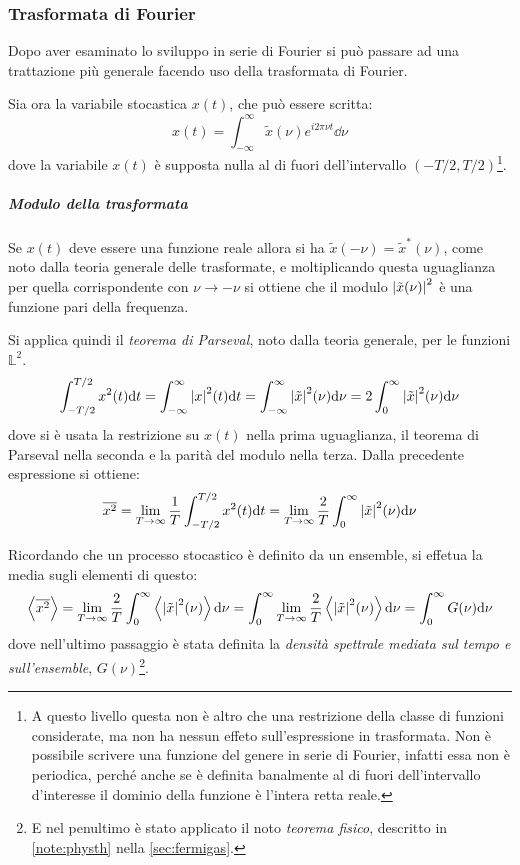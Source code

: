 \subsubsection{Trasformata di Fourier}

Dopo aver esaminato lo sviluppo in serie di Fourier si può passare ad una trattazione più generale facendo uso della trasformata di Fourier.

Sia ora la variabile stocastica $ x(t) $, che può essere scritta:
\[ x(t) = \int_{-\infty}^{\infty} \tilde{x}(\nu) e ^{i 2\pi \nu t} \dd \nu \]
dove la variabile $ x(t) $ è supposta nulla al di fuori dell'intervallo $ (-T/2, T/2) $\footnote{A questo livello questa non è altro che una restrizione della classe di funzioni considerate, ma non ha nessun effeto sull'espressione in trasformata. Non è possibile scrivere una funzione del genere in serie di Fourier, infatti essa non è periodica, perché anche se è definita banalmente al di fuori dell'intervallo d'interesse il dominio della funzione è l'intera retta reale.}.

\subparagraph{Modulo della trasformata}	Se $ x(t) $ deve essere una funzione reale allora si ha $ \tilde{x}(-\nu) = \tilde{x}^\ast(\nu) $, come noto dalla teoria generale delle trasformate, e moltiplicando questa uguaglianza per quella corrispondente con $ \nu \rightarrow - \nu $ si ottiene che il modulo $ \abs{\tilde{x}(\nu)}^2 $ è una funzione pari della frequenza.
\newline

Si applica quindi il \textit{teorema di Parseval}, noto dalla teoria generale, per le funzioni $ \mathbb{L}^2 $.
\[ \int_{-T/2}^{T/2} x^2(t) \dd t = \int_{-\infty}^{\infty} \abs{x}^2(t) \dd t = \int_{-\infty}^{\infty} \abs{\tilde{x}}^2(\nu) \dd \nu = 2 \int_{0}^{\infty} \abs{\tilde{x}}^2(\nu) \dd \nu \]
dove si è usata la restrizione su $ x(t) $ nella prima uguaglianza, il teorema di Parseval nella seconda e la parità del modulo nella terza. Dalla precedente espressione si ottiene\footnotemark:
\[ \overline{x^2} = \lim\limits_{T \rightarrow \infty} \frac{1}{T} \int_{-T/2}^{T/2} x^2(t) \dd t = \lim\limits_{T \rightarrow \infty} \frac{2}{T} \int_{0}^{\infty} \abs{\tilde{x}}^2(\nu) \dd \nu \]

Ricordando che un processo stocastico è definito da un ensemble, si effetua la media sugli elementi di questo:
\[ \expval{\overline{x^2}} = \lim\limits_{T \rightarrow \infty} \frac{2}{T} \int_{0}^{\infty} \expval{\abs{\tilde{x}}^2(\nu)} \dd \nu = \int_{0}^{\infty} \lim\limits_{T \rightarrow \infty} \frac{2}{T} \expval{\abs{\tilde{x}}^2(\nu)} \dd \nu  = \int_{0}^\infty G(\nu) \dd \nu \]
dove nell'ultimo passaggio è stata definita la \textit{densità spettrale mediata sul tempo e sull'ensemble}, $ G(\nu) $\footnote{E nel penultimo è stato applicato il noto \textit{teorema fisico}, descritto in \cref{note:physth} nella \cref{sec:fermigas}.}.

